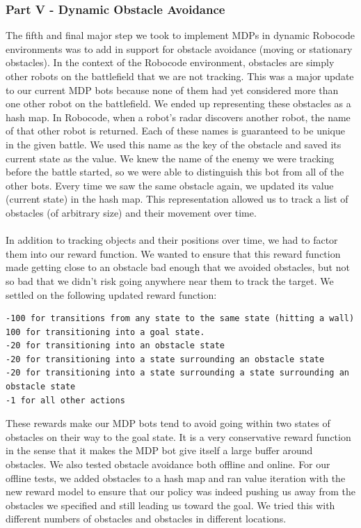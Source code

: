 \documentclass{aiaa-tc}%
\begin{document}
\subsubsection{Part V - Dynamic Obstacle Avoidance}
The fifth and final major step we took to implement MDPs in dynamic Robocode environments was to add in support for obstacle avoidance (moving or stationary obstacles). In the context of the Robocode environment, obstacles are simply other robots on the battlefield that we are not tracking. This was a major update to our current MDP bots because none of them had yet considered more than one other robot on the battlefield. We ended up representing these obstacles as a hash map. In Robocode, when a robot's radar discovers another robot, the name of that other robot is returned. Each of these names is guaranteed to be unique in the given battle. We used this name as the key of the obstacle and saved its current state as the value. We knew the name of the enemy we were tracking before the battle started, so we were able to distinguish this bot from all of the other bots. Every time we saw the same obstacle again, we updated its value (current state) in the hash map. This representation allowed us to track a list of obstacles (of arbitrary size) and their movement over time.  \\ \\
In addition to tracking objects and their positions over time, we had to factor them into our reward function. We wanted to ensure that this reward function made getting close to an obstacle bad enough that we avoided obstacles, but not so bad that we didn't risk going anywhere near them to track the target. We settled on the following updated reward function: 
\begin{verbatim}
-100 for transitions from any state to the same state (hitting a wall)
100 for transitioning into a goal state.
-20 for transitioning into an obstacle state
-20 for transitioning into a state surrounding an obstacle state
-20 for transitioning into a state surrounding a state surrounding an obstacle state
-1 for all other actions	
\end{verbatim}
These rewards make our MDP bots tend to avoid going within two states of obstacles on their way to the goal state. It is a very conservative reward function in the sense that it makes the MDP bot give itself a large buffer around obstacles. We also tested obstacle avoidance both offline and online. For our offline tests, we added obstacles to a hash map and ran value iteration with the new reward model to ensure that our policy was indeed pushing us away from the obstacles we specified and still leading us toward the goal. We tried this with different numbers of obstacles and obstacles in different locations. \\ \\
\end{document}
